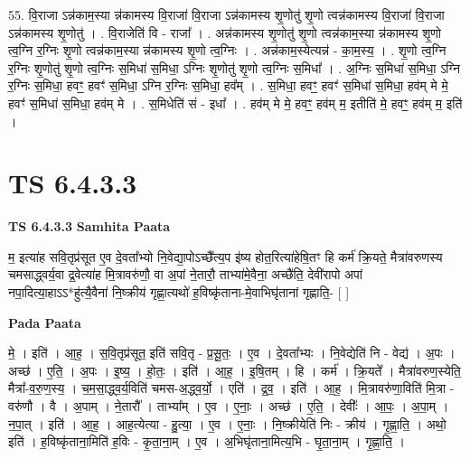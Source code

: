 \documentclass[17pt]{extarticle}
\begin{document}
55. वि॒राजा ऽन्न॑काम॒स्या न्न॑कामस्य वि॒राजा॑ वि॒राजा ऽन्न॑कामस्य शृ॒णोतु॑ शृ॒णो त्वन्न॑कामस्य वि॒राजा॑ वि॒राजा ऽन्न॑कामस्य शृ॒णोतु॑ । . वि॒राजेति॑ वि - राजा᳚ । . अन्न॑कामस्य शृ॒णोतु॑ शृ॒णो त्वन्न॑काम॒स्या न्न॑कामस्य शृ॒णो त्व॒ग्नि र॒ग्निः शृ॒णो त्वन्न॑काम॒स्या न्न॑कामस्य शृ॒णो त्व॒ग्निः । . अन्न॑काम॒स्येत्यन्न॑ - का॒म॒स्य॒ । . शृ॒णो त्व॒ग्नि र॒ग्निः शृ॒णोतु॑ शृ॒णो त्व॒ग्निः स॒मिधा॑ स॒मिधा॒ ऽग्निः शृ॒णोतु॑ शृ॒णो त्व॒ग्निः स॒मिधा᳚ । . अ॒ग्निः स॒मिधा॑ स॒मिधा॒ ऽग्नि र॒ग्निः स॒मिधा॒ हवꣳ॒॒ हवꣳ॑ स॒मिधा॒ ऽग्नि र॒ग्निः स॒मिधा॒ हव᳚म् । . स॒मिधा॒ हवꣳ॒॒ हवꣳ॑ स॒मिधा॑ स॒मिधा॒ हव॑म् मे मे॒ हवꣳ॑ स॒मिधा॑ स॒मिधा॒ हव॑म् मे । . स॒मिधेति॑ सं - इधा᳚ । . हव॑म् मे मे॒ हवꣳ॒॒ हव॑म् म॒ इतीति॑ मे॒ हवꣳ॒॒ हव॑म् म॒ इति॑ । \newline
\pagebreak
{}

\section{ TS 6.4.3.3 }

\textbf{TS 6.4.3.3 } \newline
\textbf{Samhita Paata} \newline

म॒ इत्या॑ह सवि॒तृप्र॑सूत ए॒व दे॒वता᳚भ्यो नि॒वेद्या॒पोऽच्छै᳚त्य॒प इ॑ष्य होत॒रित्या॑हेषि॒तꣳ हि कर्म॑ क्रि॒यते॒ मैत्रा॑वरुणस्य चमसाद्ध्वर्य॒वा द्र॒वेत्या॑ह मि॒त्रावरु॑णौ॒ वा अ॒पां ने॒तारौ॒ ताभ्या॑मे॒वैना॒ अच्छै॑ति॒ देवी॑रापो अपां नपा॒दित्या॒हाऽऽ*हु॑त्यै॒वैना॑ नि॒ष्क्रीय॑ गृह्णा॒त्यथो॑ ह॒विष्कृ॑ताना-मे॒वाभिघृ॑तानां गृह्णाति॒- [  ] \newline

\textbf{Pada Paata} \newline

मे॒ । इति॑ । आ॒ह॒ । स॒वि॒तृप्र॑सूत॒ इति॑ सवि॒तृ - प्र॒सू॒तः॒ । ए॒व । दे॒वता᳚भ्यः । नि॒वेद्येति॑ नि - वेद्य॑ । अ॒पः । अच्छ॑ । ए॒ति॒ । अ॒पः । इ॒ष्य॒ । हो॒तः॒ । इति॑ । आ॒ह॒ । इ॒षि॒तम् । हि । कर्म॑ । क्रि॒यते᳚ । मैत्रा॑वरुण॒स्येति॒ मैत्रा᳚-व॒रु॒ण॒स्य॒ । च॒म॒सा॒द्ध्व॒र्य॒विति॑ चमस-अ॒द्ध्व॒र्यो॒ । एति॑ । द्र॒व॒ । इति॑ । आ॒ह॒ । मि॒त्रावरु॑णा॒विति॑ मि॒त्रा - वरु॑णौ । वै । अ॒पाम् । ने॒तारौ᳚ । ताभ्या᳚म् । ए॒व । ए॒नाः॒ । अच्छ॑ । ए॒ति॒ । देवीः᳚ । आ॒पः॒ । अ॒पा॒म् । न॒पा॒त् । इति॑ । आ॒ह॒ । आह॒त्येत्या - हु॒त्या॒ । ए॒व । ए॒नाः॒ । नि॒ष्क्रीयेति॑ निः - क्रीय॑ । गृ॒ह्णा॒ति॒ । अथो॒ इति॑ । ह॒विष्कृ॑ताना॒मिति॑ ह॒विः - कृ॒ता॒ना॒म् । ए॒व । अ॒भिघृ॑ताना॒मित्य॒भि - घृ॒ता॒ना॒म् । गृ॒ह्णा॒ति॒ ।  \newline
\end{document}
